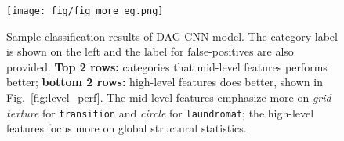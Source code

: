\documentclass[10pt,twocolumn,letterpaper]{article}
\newcommand{\deva}[1]{\textcolor{red}{[Deva: #1]}}
\begin{document}
%
%
%
%

\begin{figure}[htbp]
\centering
	\texttt{[image: fig/fig\_more\_eg.png]}
\caption{Sample classification results of DAG-CNN model. The category label is shown on the left and the label for false-positives are also provided. \textbf{Top 2 rows:} categories that mid-level features performs better; \textbf{bottom 2 rows:} high-level features does better, shown in Fig.~\ref{fig:level_perf}. The mid-level features emphasize more on \textit{grid texture} for {\tt transition} and \textit{circle} for {\tt laundromat}; the high-level features focus more on global structural statistics.}

\label{fig:more_eg}
\end{figure}
\end{document}
